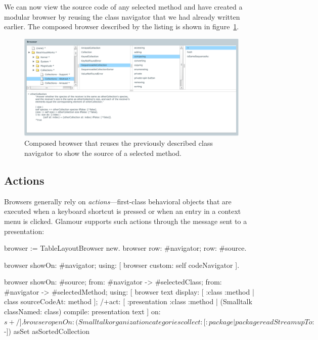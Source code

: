 \documentclass[a4paper,10pt,twoside]{book}
\begin{document}
We can now view the source code of any selected method and have
created a modular browser by reusing the class navigator that we had
already written earlier. The composed browser described by the listing
is shown in figure~\ref{fig:composed-browser}.

\begin{figure}[htbp]
\centerline{\includegraphics[width=\linewidth]{classbrowser.pdf}}
\caption{Composed browser that reuses the previously described class navigator to show the source of a selected method.}
\label{fig:composed-browser}
\end{figure}


\subsection{Actions}
\label{sec:tutorial/actions}

Browsers generally rely on \emph{actions}---first-class behavioral objects that are executed when a keyboard shortcut is pressed or when an entry in a context menu is clicked. Glamour supports such actions through the  message sent to a presentation:

\begin{code}{}
browser := TableLayoutBrowser new.
browser
	row: #navigator;
	row: #source.

browser showOn: #navigator; using: [
	browser custom: self codeNavigator
].

browser
	showOn: #source;
	from: #navigator -> #selectedClass;
	from: #navigator -> #selectedMethod; using: [
	browser text
		display: [ :class :method | class sourceCodeAt: method ];
		/+act: [ :presentation :class :method |
			(Smalltalk classNamed: class) compile: presentation text
		] on: $s+/
].

browser openOn: (Smalltalk organization  categories
                     collect: [:package | package readStream upTo: $-])
                           asSet asSortedCollection
\end{code}
\end{document}
